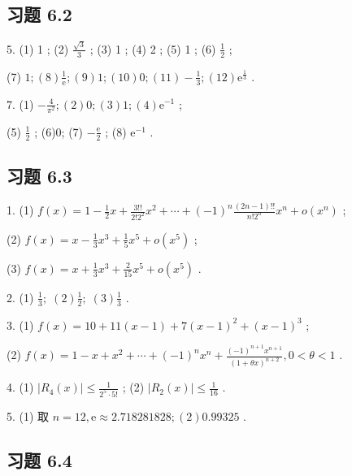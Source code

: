\subsection{习题 6.2}

5. (1) 1 ; (2) \(\frac{\sqrt{3}}{3}\) ; (3) 1 ; (4) 2 ; (5) 1 ; (6) \(\frac{1}{2}\) ;

(7) \(1;\left( 8\right) \frac{1}{\mathrm{e}};\left( 9\right) 1;\left( {10}\right) 0;\left( {11}\right)  - \frac{1}{3};\left( {12}\right) {\mathrm{e}}^{\frac{1}{3}}\) .

7. (1) \(- \frac{4}{{\pi }^{2}};\left( 2\right) 0;\left( 3\right) 1;\left( 4\right) {\mathrm{e}}^{-1}\) ;

(5) \(\frac{1}{2}\) ; (6)0; (7) \(- \frac{\mathrm{e}}{2}\) ; (8) \({\mathrm{e}}^{-1}\) .

\subsection{习题 6.3}

1. (1) \(f\left( x\right)  = 1 - \frac{1}{2}x + \frac{3!!}{2!{2}^{2}}{x}^{2} + \cdots  + {\left( -1\right) }^{n}\frac{\left( {{2n} - 1}\right) !!}{n!{2}^{n}}{x}^{n} + o\left( {x}^{n}\right)\) ;

(2) \(f\left( x\right)  = x - \frac{1}{3}{x}^{3} + \frac{1}{5}{x}^{5} + o\left( {x}^{5}\right)\) ;

(3) \(f\left( x\right)  = x + \frac{1}{3}{x}^{3} + \frac{2}{15}{x}^{5} + o\left( {x}^{5}\right)\) .

2. (1) \(\frac{1}{3};\;\left( 2\right) \frac{1}{2};\;\left( 3\right) \frac{1}{3}\) .

3. (1) \(f\left( x\right)  = {10} + {11}\left( {x - 1}\right)  + 7{\left( x - 1\right) }^{2} + {\left( x - 1\right) }^{3}\) ;

(2) \(f\left( x\right)  = 1 - x + {x}^{2} + \cdots  + {\left( -1\right) }^{n}{x}^{n} + \frac{{\left( -1\right) }^{n + 1}{x}^{n + 1}}{{\left( 1 + \theta x\right) }^{n + 2}},0 < \theta  < 1\) .

4. (1) \(\left| {{R}_{4}\left( x\right) }\right|  \leq  \frac{1}{{2}^{5} \cdot  5!}\) ; (2) \(\left| {{R}_{2}\left( x\right) }\right|  \leq  \frac{1}{16}\) .

5. (1) 取 \(n = {12},\mathrm{e} \approx  {2.718281828};\left( 2\right) {0.99325}\) .

\subsection{习题 6.4}

